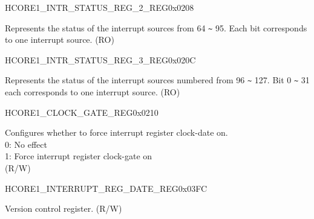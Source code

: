 \begin{register}{H}{CORE1\_INTR\_STATUS\_REG\_2\_REG}{0x0208}\label{regdesc:CORE1INTRSTATUSREG2REG}
%
\regnewline%
\begin{regdesc}\begin{reglist}
\label{fielddesc:CORE1CORE1INTRSTATUS2}\item [CORE1\_INTR\_STATUS\_2] Represents the status of the interrupt sources from 64 \verb+~+ 95. Each bit corresponds to one interrupt source. (RO)
\end{reglist}\end{regdesc}
\end{register}


\begin{register}{H}{CORE1\_INTR\_STATUS\_REG\_3\_REG}{0x020C}\label{regdesc:CORE1INTRSTATUSREG3REG}
%
\regnewline%
\begin{regdesc}\begin{reglist}
\label{fielddesc:CORE1CORE1INTRSTATUS3}\item [CORE1\_INTR\_STATUS\_3] Represents the status of the interrupt sources numbered from 96 \verb+~+ 127. Bit 0 \verb+~+ 31 each corresponds to one interrupt source. (RO)
\end{reglist}\end{regdesc}
\end{register}


\begin{register}{H}{CORE1\_CLOCK\_GATE\_REG}{0x0210}\label{regdesc:CORE1CLOCKGATEREG}
%
%
\regnewline%
\begin{regdesc}\begin{reglist}
\label{fielddesc:CORE1CORE1REGCLKEN}\item [CORE1\_REG\_CLK\_EN] Configures whether to force interrupt register clock-date on.\\
0: No effect \\
1: Force interrupt register clock-gate on \\
(R/W)
\end{reglist}\end{regdesc}
\end{register}


\begin{register}{H}{CORE1\_INTERRUPT\_REG\_DATE\_REG}{0x03FC}\label{regdesc:CORE1INTERRUPTREGDATEREG}
%
%
\regnewline%
\begin{regdesc}\begin{reglist}
\label{fielddesc:CORE1CORE1INTERRUPTREGDATE}\item [CORE1\_INTERRUPT\_REG\_DATE] Version control register. (R/W)
\end{reglist}\end{regdesc}
\end{register}

